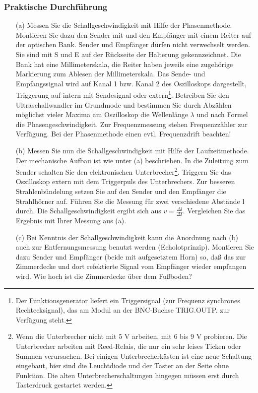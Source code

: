 \documentclass[12pt]{scrartcl}
\begin{document}
\subsubsection{Praktische Durchführung}
\begin{itemize}
\item[(a)]
Messen Sie die Schallgeschwindigkeit mit Hilfe der Phasenmethode. Montieren Sie dazu den Sender mit und den Empfänger mit einem Reiter auf der optischen Bank. Sender und Empfänger dürfen nicht verwechselt werden. Sie sind mit S und E auf der Rückseite der Halterung gekennzeichnet. Die Bank hat eine Millimeterskala, die Reiter haben
jeweils eine zugehörige Markierung zum Ablesen der Millimeterskala. Das Sende- und Empfangssignal wird auf Kanal 1 bzw. Kanal 2 des Oszilloskops dargestellt, Triggerung auf intern mit Sendesignal oder extern\footnote{Der Funktionsgenerator liefert ein Triggersignal (zur Frequenz synchrones Rechtecksignal), das am Modul an der BNC-Buchse TRIG.OUTP. zur Verfügung steht.}. Betreiben Sie den Ultraschallwandler im Grundmode und bestimmen Sie durch Abzählen möglichst vieler Maxima am Oszilloskop die Wellenlänge $\lambda$
und nach Formel
die Phasengeschwindigkeit.
Zur Frequenzmessung stehen Frequenzzähler zur Verfügung. Bei der Phasenmethode einen evtl. Frequenzdrift beachten!
\item[(b)]
Messen Sie nun die Schallgeschwindigkeit mit Hilfe der Laufzeitmethode. Der mechanische Aufbau ist wie unter (a) beschrieben. In die Zuleitung zum Sender schalten Sie den elektronischen Unterbrecher\footnote{Wenn die Unterbrecher nicht mit 5 V arbeiten, mit 6 bis 9 V probieren. Die Unterbrecher arbeiten mit Reed-Relais, die nur ein sehr leises Ticken oder Summen verursachen. Bei einigen Unterbrecherkästen ist eine neue Schaltung eingebaut, hier sind die Leuchtdiode und der Taster an der Seite ohne Funktion. Die alten Unterbrecherschaltungen hingegen müssen erst durch Tasterdruck gestartet werden.}. Triggern Sie das Oszilloskop extern mit dem Triggerpuls des Unterbrechers. Zur besseren Strahlenbündelung setzen Sie auf den Sender und den Empfänger die Strahlhörner auf. Führen Sie die Messung für zwei verschiedene Abstände
l durch. Die Schallgeschwindigkeit ergibt sich aus $v = \frac{\Delta l}{\Delta t}$. Vergleichen Sie das Ergebnis mit Ihrer Messung aus (a).
\item[(c)]
Bei Kenntnis der Schallgeschwindigkeit kann die Anordnung nach (b) auch zur Entfernungsmessung benutzt werden (Echolotprinzip). Montieren Sie dazu Sender und Empfänger (beide mit aufgesetztem Horn) so, daß das zur Zimmerdecke und dort refektierte Signal vom Empfänger wieder empfangen wird. Wie hoch ist die Zimmerdecke über dem Fußboden?
\end{itemize}
\end{document}
